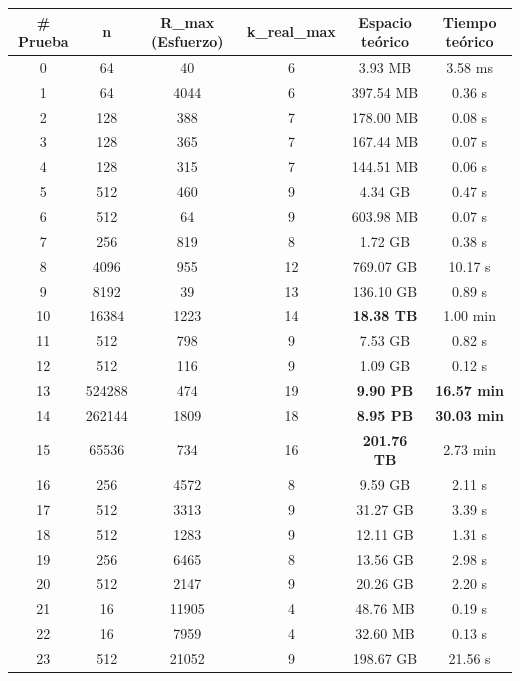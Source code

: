 \documentclass[11pt,letter]{article}
\begin{document}
\begin{itemize}
\begin{table}[H]
    \centering
    \small
    \begin{tabular}{|c|c|c|c|c|c|}
    \hline
    \textbf{\# Prueba} & \textbf{n} & \textbf{R\_max (Esfuerzo)} & \textbf{k\_real\_max} & \textbf{Espacio teórico} & \textbf{Tiempo teórico} \\
    \hline
    0 & 64 & 40 & 6 & 3.93 MB & 3.58 ms \\
    1 & 64 & 4044 & 6 & 397.54 MB & 0.36 s \\
    2 & 128 & 388 & 7 & 178.00 MB & 0.08 s \\
    3 & 128 & 365 & 7 & 167.44 MB & 0.07 s \\
    4 & 128 & 315 & 7 & 144.51 MB & 0.06 s \\
    5 & 512 & 460 & 9 & 4.34 GB & 0.47 s \\
    6 & 512 & 64 & 9 & 603.98 MB & 0.07 s \\
    7 & 256 & 819 & 8 & 1.72 GB & 0.38 s \\
    8 & 4096 & 955 & 12 & 769.07 GB & 10.17 s \\
    9 & 8192 & 39 & 13 & 136.10 GB & 0.89 s \\
    10 & 16384 & 1223 & 14 & \cellcolor{yellow}\textbf{18.38 TB} & 1.00 min \\
    11 & 512 & 798 & 9 & 7.53 GB & 0.82 s \\
    12 & 512 & 116 & 9 & 1.09 GB & 0.12 s \\
    13 & 524288 & 474 & 19 & \cellcolor{yellow}\textbf{9.90 PB} & \cellcolor{yellow}\textbf{16.57 min} \\
    14 & 262144 & 1809 & 18 & \cellcolor{yellow}\textbf{8.95 PB} & \cellcolor{yellow}\textbf{30.03 min} \\
    15 & 65536 & 734 & 16 & \cellcolor{yellow}\textbf{201.76 TB} & 2.73 min \\
    16 & 256 & 4572 & 8 & 9.59 GB & 2.11 s \\
    17 & 512 & 3313 & 9 & 31.27 GB & 3.39 s \\
    18 & 512 & 1283 & 9 & 12.11 GB & 1.31 s \\
    19 & 256 & 6465 & 8 & 13.56 GB & 2.98 s \\
    20 & 512 & 2147 & 9 & 20.26 GB & 2.20 s \\
    21 & 16 & 11905 & 4 & 48.76 MB & 0.19 s \\
    22 & 16 & 7959 & 4 & 32.60 MB & 0.13 s \\
    23 & 512 & 21052 & 9 & 198.67 GB & 21.56 s \\

\end{tabular}
\end{table}
\end{itemize}
\end{document}
